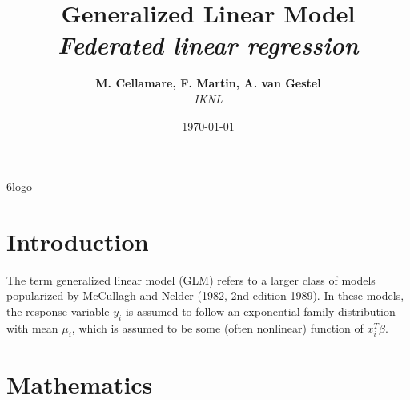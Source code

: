 \documentclass[11pt]{vantage6} %
\title{\textbf{Generalized Linear Model} \\ {\Large\itshape Federated linear regression}} %
\author{\textbf{M. Cellamare, F. Martin, A. van Gestel} \\ \textit{IKNL}} %
\date{\today} %
\begin{document}
\thispagestyle{firstpage}
\vantage6logo
\vspace{5cm}
\maketitle %
\pagebreak


\tableofcontents
\pagebreak


\section{Introduction}
The term generalized linear model (GLM) refers to a larger class of models
popularized by McCullagh and Nelder (1982, 2nd edition 1989). In these models,
the response variable $y_i$ is assumed to follow an exponential family distribution
with mean $\mu_i$, which is assumed to be some (often nonlinear) function of $x_i^T \beta$.


\section{Mathematics}
\end{document}
